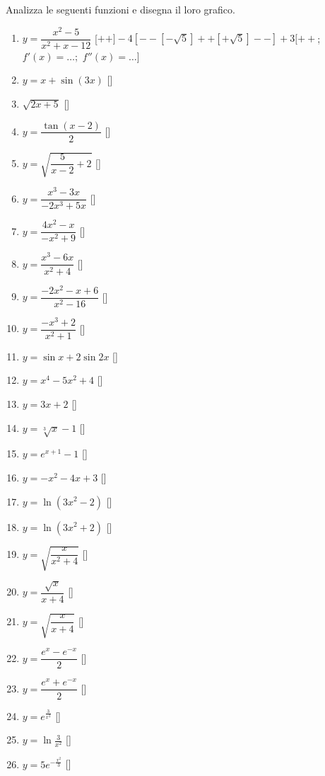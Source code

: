 \bigskip

\begin{esercizio}\label{ese:stufun.7e}
Analizza le seguenti funzioni e disegna il loro grafico.
\begin{enumerate} [label=\alph*)]
\item \(y = \dfrac{x^2 -5}{x^2 +x -12}\)
\hfill 
[\footnotesize\(++]-4[--[-\sqrt{5}]++[+\sqrt{5}]--]+3[++\);~ 
 \(f'(x) = \dots\);~\(f''(x) = \dots\)]
\item \(y = x + \sin(3x)\)
\hfill []
\item \(\sqrt{2x +5}\)
\hfill []
\item \(y = \dfrac{\tan(x -2)}{2}\)
\hfill []
\item \(y = \sqrt{\dfrac{5}{x -2} +2}\)
\hfill []
\item \(y = \dfrac{x^3 -3x}{-2x^3 +5x}\)
\hfill []
\item \(y = \dfrac{4x^2 -x}{-x^2 +9}\)
\hfill []
\item \(y = \dfrac{x^3 -6x}{x^2 +4}\)
\hfill []
\item \(y = \dfrac{-2x^2 -x +6}{x^2 -16}\)
\hfill []
\item \(y = \dfrac{-x^3 +2}{x^2 +1}\)
\hfill []
\item \(y = \sin x +2 \sin 2x\)
\hfill []
\item \(y = x^4 -5x^2 +4\)
\hfill []
\item \(y = 3x +2\)
\hfill []
\item \(y = \sqrt[3]{x} -1\)
\hfill []
\item \(y = e^{x +1} -1\)
\hfill []
\item \(y = -x^2 -4x +3\)
\hfill []
\item \(y = \ln(3x^2 -2)\)
\hfill []
\item \(y = \ln(3x^2 +2)\)
\hfill []
\item \(y = \sqrt{\dfrac{x}{x^2 +4}}\)
\hfill []
\item \(y = \dfrac{\sqrt{x}}{x +4}\)
\hfill []
\item \(y = \sqrt{\dfrac{x}{x +4}}\)
\hfill []
\item \(y = \dfrac{e^{x} -e^{-x}}{2}\)
\hfill []
\item \(y = \dfrac{e^{x} +e^{-x}}{2}\)
\hfill []
\item \(y = e^{\frac{3}{x^2}}\)
\hfill []
\item \(y = \ln{\frac{3}{x^2}}\)
\hfill []
\item \(y = 5e^{-\frac{x^2}{3}}\)
\hfill []
\end{enumerate}
\end{esercizio}

\begin{comment}
 
\begin{esercizio}
\label{ese:}
\end{esercizio}

\end{comment}
